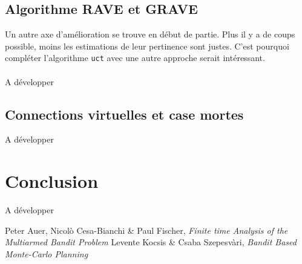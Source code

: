 \documentclass[a4paper]{article}
\theoremstyle{definition}
\begin{document}
\subsection{Algorithme RAVE et GRAVE}

Un autre axe d'amélioration se trouve en début de partie. Plus il y a de coups possible, moins les estimations de leur pertinence sont justes. C'est pourquoi compléter l'algorithme \texttt{uct} avec une autre approche serait intéressant.\\
\\
A développer

\subsection{Connections virtuelles et case mortes}

A développer
\newpage

\section{Conclusion}

A développer

\newpage

\listoffigures 

\newpage

%
\begin{thebibliography}{9}

Peter Auer, Nicol\`o Cesa-Bianchi \& Paul Fischer, {\em Finite time Analysis of the Multiarmed Bandit Problem}
Levente Kocsis \& Csaba Szepesv\`ari, {\em Bandit Based Monte-Carlo Planning}

\end{thebibliography}
\end{document}
